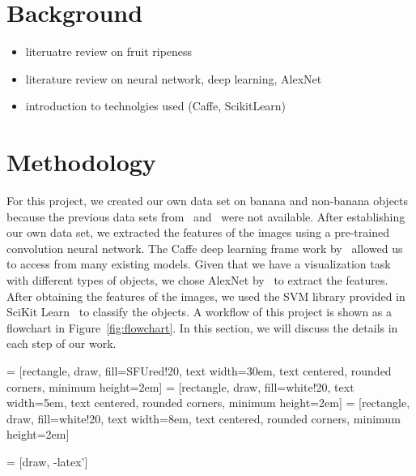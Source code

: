 \documentclass{article} %
\begin{document}
\section {Background}
\begin{itemize}
\item literuatre review on fruit ripeness
\item literature review on neural network, deep learning, AlexNet
\item introduction to technolgies used (Caffe, ScikitLearn)
\end{itemize}
\section{Methodology}
For this project, we created our own data set on banana and non-banana objects because the previous data sets from~\citet{saad2009recognizing} and~\citet{paulraj2009color} were not available. After establishing our own data set, we extracted the features of the images using a pre-trained convolution neural network. The Caffe deep learning frame work by~\citet{jia2014caffe} allowed us to access from many existing models. Given that we have a visualization task with different types of objects, we chose AlexNet by~\citet{krizhevsky2012imagenet} to extract the features. After obtaining the features of the images, we used the SVM library provided in SciKit Learn~\citep{scikit-learn} to classify the objects. A workflow of this project is shown as a flowchart in Figure~\ref{fig:flowchart}. In this section, we will discuss the details in each step of our work. 

 = [rectangle, draw, fill=SFUred!20, 
    text width=30em, text centered, rounded corners, minimum height=2em]
     = [rectangle, draw, fill=white!20, 
    text width=5em, text centered, rounded corners, minimum height=2em]
         = [rectangle, draw, fill=white!20, 
    text width=8em, text centered, rounded corners, minimum height=2em]

 = [draw, -latex']
\end{document}

